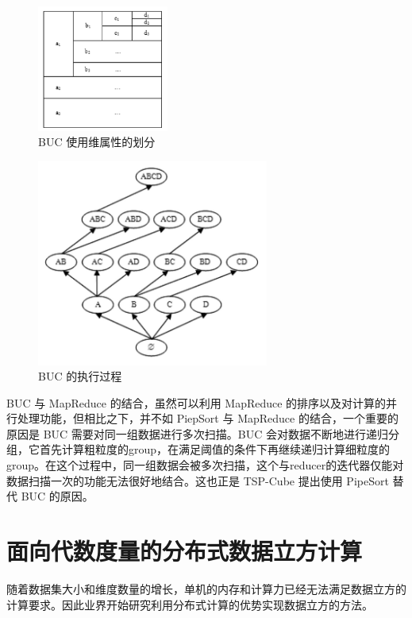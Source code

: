 \begin{figure}[!htb]
\centering\includegraphics[width=1.7in]{picture/ch_current_research/BUC_partition} 
\caption{BUC 使用维属性的划分}\label{BUC_partition} 
\end{figure} 


\begin{figure}[!htb]
\centering\includegraphics[width=3in]{picture/ch_current_research/BUC_execution} 
\caption{BUC 的执行过程}\label{BUC_execution} 
\end{figure} 

BUC 与 MapReduce  的结合，虽然可以利用 MapReduce 的排序以及对计算的并行处理功能，但相比之下，并不如 PiepSort 与 MapReduce 的结合，一个重要的原因是 BUC 需要对同一组数据进行多次扫描。BUC 会对数据不断地进行递归分组，它首先计算粗粒度的group，在满足阈值的条件下再继续递归计算细粒度的group。在这个过程中，同一组数据会被多次扫描，这个与reducer的迭代器仅能对数据扫描一次的功能无法很好地结合。这也正是 TSP-Cube 提出使用 PipeSort 替代 BUC 的原因。



\section{面向代数度量的分布式数据立方计算}

随着数据集大小和维度数量的增长，单机的内存和计算力已经无法满足数据立方的计算要求。因此业界开始研究利用分布式计算的优势实现数据立方的方法。\cite{nandi2011distributed} \cite{dehne2006cgmcube} \cite{ng2001iceberg} \cite{lee2012efficient}  \cite{dehne2006cgmcube}

